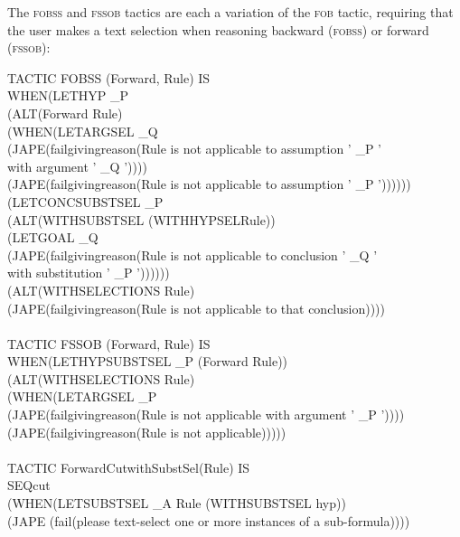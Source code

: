 The \textsc{fobss} and \textsc{fssob} tactics are each a variation of the \textsc{fob} tactic, requiring that the user makes a text selection when reasoning backward (\textsc{fobss}) or forward (\textsc{fssob}):
\begin{japeish}
TACTIC FOBSS (Forward, Rule) IS \\
\tab WHEN\tab (LETHYP \_P\\
\tab \tab \tab (ALT\tab (Forward Rule)\\
\tab \tab \tab \tab (WHEN\tab (LETARGSEL \_Q \\
\tab \tab \tab \tab \tab \tab (JAPE(failgivingreason(Rule is not applicable to assumption ' \_P ' \\
\tab \tab \tab \tab \tab \tab \tab \tab \tab \tab with argument ' \_Q '))))\\
\tab \tab \tab \tab \tab (JAPE(failgivingreason(Rule is not applicable to assumption ' \_P ')))))) \\
\tab \tab (LETCONCSUBSTSEL \_P \\
\tab \tab \tab (ALT\tab (WITHSUBSTSEL (WITHHYPSELRule))\\
\tab \tab \tab \tab (LETGOAL \_Q\\
\tab \tab \tab \tab \tab (JAPE(failgivingreason(Rule is not applicable to conclusion ' \_Q '\\
\tab \tab \tab \tab \tab \tab \tab \tab \tab \tab with substitution ' \_P '))))))\\
\tab \tab (ALT\tab (WITHSELECTIONS Rule)\\
\tab \tab \tab (JAPE(failgivingreason(Rule is not applicable to that conclusion)))) \\
\\
TACTIC FSSOB (Forward, Rule) IS \\
\tab WHEN\tab (LETHYPSUBSTSEL \_P (Forward Rule)) \\
\tab \tab (ALT\tab (WITHSELECTIONS Rule)\\
\tab \tab \tab (WHEN\tab (LETARGSEL \_P\\
\tab \tab \tab \tab \tab (JAPE(failgivingreason(Rule is not applicable with argument ' \_P '))))\\
\tab \tab \tab \tab (JAPE(failgivingreason(Rule is not applicable))))) \\
\\
TACTIC ForwardCutwithSubstSel(Rule) IS\\
\tab SEQ\tab cut \\
\tab \tab (WHEN\tab (LETSUBSTSEL \_A Rule (WITHSUBSTSEL hyp))\\
\tab \tab \tab \tab (JAPE (fail(please text-select one or more instances of a sub-formula))))
\end{japeish}

